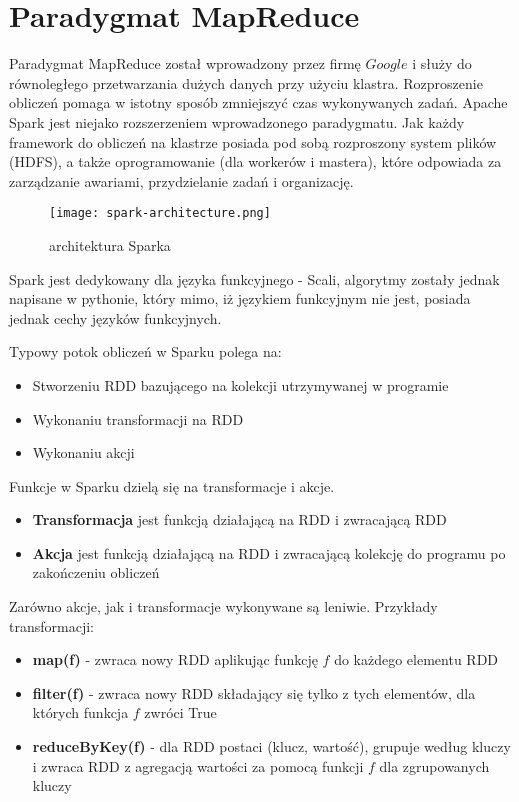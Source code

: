 \documentclass[magisterska]{pracamgr}
\theoremstyle{plain}
\theoremstyle{definition}
\theoremstyle{remark}
\begin{document}
\section{Paradygmat MapReduce}

Paradygmat MapReduce został wprowadzony przez firmę $Google$ i służy do równoległego przetwarzania
dużych danych przy użyciu klastra.
Rozproszenie obliczeń pomaga w istotny sposób zmniejszyć czas wykonywanych zadań.
Apache Spark jest niejako rozszerzeniem wprowadzonego paradygmatu. 
Jak każdy framework do obliczeń na klastrze posiada pod sobą rozproszony system plików (HDFS), 
a także oprogramowanie (dla workerów i mastera), które odpowiada za zarządzanie awariami, przydzielanie 
zadań i organizację. 
\newpage

\begin{figure}
 \caption{architektura Sparka}
 \texttt{[image: spark-architecture.png]}
\end{figure}

Spark jest dedykowany dla języka funkcyjnego - Scali, algorytmy zostały jednak napisane w pythonie, który 
mimo, iż językiem funkcyjnym nie jest, posiada jednak cechy języków funkcyjnych. 

Typowy potok obliczeń w Sparku polega na:
\begin{itemize}
 \item Stworzeniu RDD bazującego na kolekcji utrzymywanej w programie
 \item Wykonaniu transformacji na RDD
 \item Wykonaniu akcji
\end{itemize}

Funkcje w Sparku dzielą się na transformacje i akcje. 
\begin{itemize}
 \item \textbf{Transformacja} jest funkcją działającą na RDD i zwracającą RDD
 \item \textbf{Akcja} jest funkcją działającą na RDD i zwracającą kolekcję do programu po zakończeniu obliczeń
\end{itemize}
Zarówno akcje, jak i transformacje wykonywane są leniwie. Przykłady transformacji:
\begin{itemize}
 \item \textbf{map(f)} - zwraca nowy RDD aplikując funkcję $f$ do każdego elementu RDD
 \item \textbf{filter(f)} - zwraca nowy RDD składający się tylko z tych elementów, dla których funkcja $f$ zwróci True
 \item \textbf{reduceByKey(f)} - dla RDD postaci (klucz, wartość), grupuje według kluczy i zwraca RDD z agregacją wartości 
 za pomocą funkcji $f$ dla zgrupowanych kluczy
\end{itemize}
\end{document}
